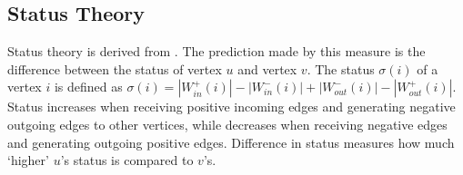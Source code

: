 
\subsection{Status Theory}

Status theory is derived from \cite{Status}. The prediction made by this measure
is the difference between the status of vertex $u$ and vertex $v$. The status
$\sigma (i)$ of a vertex $i$ is defined as $\sigma (i) = |W^+_{in}(i)| - |W^-_{in}(i)| + |W^-_{out}(i)| - |W^+_{out}(i)|$.
Status increases when receiving positive incoming edges and generating negative 
outgoing edges to other vertices, while decreases when receiving negative edges 
and generating outgoing positive edges. Difference in status measures how much ‘higher’ $u’$s 
status is compared to $v’$s.
